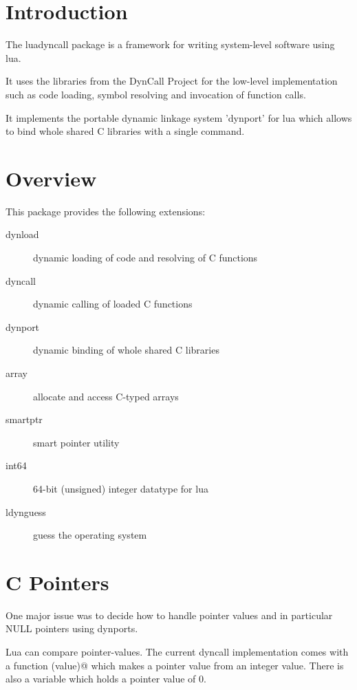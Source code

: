 \documentclass{article}
\begin{document}
\section{Introduction}

The luadyncall package is a framework for writing system-level software
using lua.

It uses the libraries from the DynCall Project for the low-level implementation
such as code loading, symbol resolving and invocation of function calls.

It implements the portable dynamic linkage system 'dynport' for lua which
allows to bind whole shared C libraries with a single command.

\section{Overview}

This package provides the following extensions:

\begin{description}
\item [dynload]   dynamic loading of code and resolving of C functions
\item [dyncall]   dynamic calling of loaded C functions
\item [dynport]   dynamic binding of whole shared C libraries
\item [array]     allocate and access C-typed arrays
\item [smartptr]  smart pointer utility
\item [int64]     64-bit (unsigned) integer datatype for lua
\item [ldynguess] guess the operating system
\end{description}

\section{C Pointers}

One major issue was to decide how to handle pointer values and in
particular NULL pointers using dynports.

Lua can compare pointer-values. The current dyncall implementation comes with 
a function \verb@topointer(value)@ which makes a pointer value from an integer 
value. There is also a \verb@NULL@ variable which holds a pointer value of 0.
\end{document}
